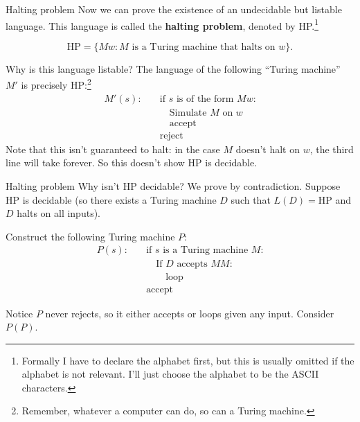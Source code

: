 \documentclass{beamer}
\begin{document}
\begin{frame}{Halting problem}
Now we can prove the existence of an undecidable but listable language. This language is called the \textbf{halting problem}, denoted by HP.\footnote{Formally I have to declare the alphabet first, but this is usually omitted if the alphabet is not relevant. I'll just choose the alphabet to be the ASCII characters.}

$$\text{HP} = \{Mw: \text{$M$ is a Turing machine that halts on $w$}\}.$$

Why is this language listable? The language of the following ``Turing machine'' $M'$ is precisely $\text{HP}$:\footnote{Remember, whatever a computer can do, so can a Turing machine.}
\begin{align*}
M'(s): & \quad \text{if $s$ is of the form $Mw$:}\\
& \quad \quad \text{Simulate $M$ on $w$}\\
& \quad \quad \text{accept}\\
& \quad \text{reject}
\end{align*}
Note that this isn't guaranteed to halt: in the case $M$ doesn't halt on $w$, the third line will take forever. So this doesn't show HP is decidable.
\end{frame}

\begin{frame}{Halting problem}
Why isn't HP decidable? We prove by contradiction. Suppose HP is decidable (so there exists a Turing machine $D$ such that $L(D) = \text{HP}$ and $D$ halts on all inputs).

\vspace{2mm}

Construct the following Turing machine $P$:
\begin{align*}
P(s): & \quad \text{if $s$ is a Turing machine $M$:}\\
& \quad \quad \text{If $D$ accepts $MM$:}\\
& \quad \quad \quad \text{loop}\\
& \quad \text{accept}
\end{align*}

Notice $P$ never rejects, so it either accepts or loops given any input. Consider $P(P)$.

\end{frame}
\end{document}
